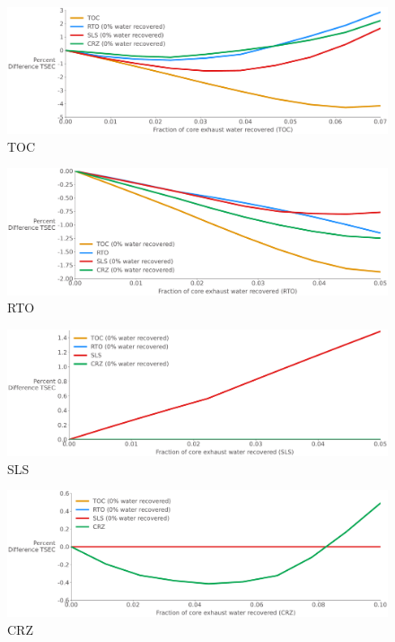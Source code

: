 \documentclass[12pt]{article}
\begin{document}
\begin{figure}[!hbt]
    \centering
    \begin{minipage}{0.48\textwidth}
        \centering
        \includegraphics[width=1.0\textwidth]{TSEC_N3-CLVR-H2-0-7-TOC.pdf}
        {TOC}
    \end{minipage}
    \begin{minipage}{0.48\textwidth}
        \centering
        \includegraphics[width=1.0\textwidth]{TSEC_N3-CLVR-H2-0-5-RTO.pdf}
        {RTO}
    \end{minipage}
    \begin{minipage}{0.48\textwidth}
        \centering
        \includegraphics[width=1.0\textwidth]{TSEC_N3-CLVR-H2-0-5-SLS.pdf}
        {SLS}
    \end{minipage}
    \begin{minipage}{0.48\textwidth}
        \centering
        \includegraphics[width=1.0\textwidth]{TSEC_N3-CLVR-H2-0-10-CRZ.pdf}
        {CRZ}
    \end{minipage}
    \caption{}
    \label{fig:para_study}
\end{figure}
\end{document}
